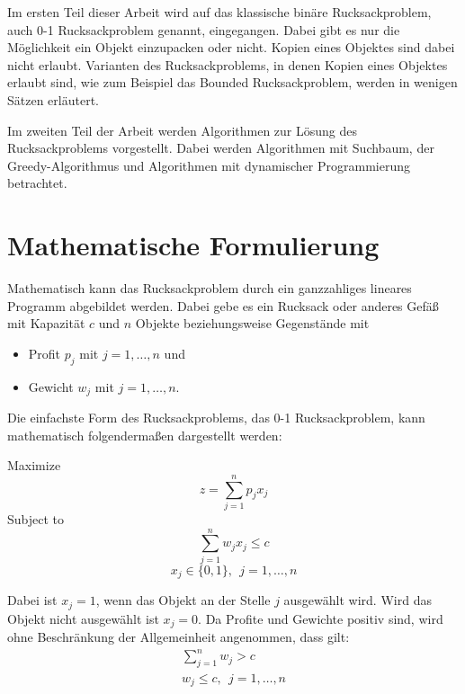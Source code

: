 Im ersten Teil dieser Arbeit wird auf das klassische binäre Rucksackproblem, auch 0-1 Rucksackproblem genannt, eingegangen. 
Dabei gibt es nur die Möglichkeit ein Objekt einzupacken oder nicht. Kopien eines Objektes sind dabei nicht erlaubt. Varianten des Rucksackproblems, in denen Kopien eines Objektes erlaubt sind, wie zum Beispiel das Bounded Rucksackproblem, werden in wenigen Sätzen erläutert.


Im zweiten Teil der Arbeit werden Algorithmen zur Lösung des Rucksackproblems vorgestellt.
Dabei werden Algorithmen mit Suchbaum, der Greedy-Algorithmus und Algorithmen mit dynamischer Programmierung betrachtet.

\chapter{Mathematische Formulierung}
Mathematisch kann das Rucksackproblem durch ein ganzzahliges lineares Programm abgebildet werden.
Dabei gebe es ein Rucksack oder anderes Gefäß mit Kapazität $c$ und $n$ Objekte beziehungsweise Gegenstände mit
\begin{itemize}
    \item Profit $p_j$ mit $j=1,\ldots,n$ und
    \item Gewicht $w_j$ mit $j=1,\ldots,n$.
\end{itemize}
Die einfachste Form des Rucksackproblems, das 0-1 Rucksackproblem, kann mathematisch folgendermaßen dargestellt werden: \cite[vgl.][]{Martello1987}

Maximize
\begin{equation}
z=\sum_{j=1}^{n}{p_jx_j} 
\end{equation}
Subject to 
\begin{equation} \label{eqn:subjectTo}
\sum_{j=1}^{n}{w_jx_j\le c}
\end{equation}
\begin{equation} \label{eqn:bedingung}
x_j\in\{0,1\},\ \ j=1,\ldots,n
\end{equation}

Dabei ist $x_j = 1$, wenn das Objekt an der Stelle $j$ ausgewählt wird. Wird das Objekt nicht ausgewählt ist $x_j = 0$. Da Profite und Gewichte positiv sind, wird ohne Beschränkung der Allgemeinheit angenommen, dass gilt: \cite[vgl.][]{Martello1987}
\begin{eqnarray}
\sum_{j=1}^{n}{w_j>c} \\
w_j\le c,\ \ j=1,\ldots,n
\end{eqnarray}


